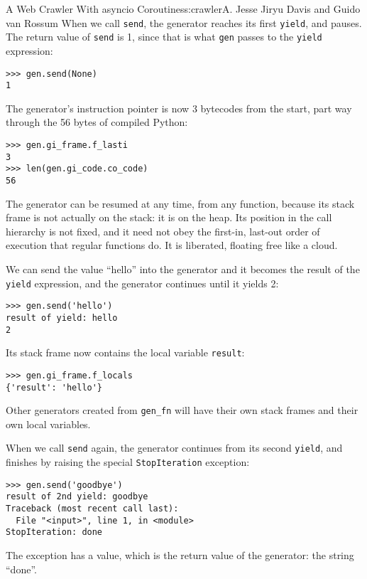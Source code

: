 \begin{aosachapter}{A Web Crawler With asyncio Coroutines}{s:crawler}{A. Jesse Jiryu Davis and Guido van Rossum}
When we call \texttt{send}, the generator reaches its first
\texttt{yield}, and pauses. The return value of \texttt{send} is 1,
since that is what \texttt{gen} passes to the \texttt{yield} expression:

\begin{verbatim}
>>> gen.send(None)
1
\end{verbatim}

The generator's instruction pointer is now 3 bytecodes from the start,
part way through the 56 bytes of compiled Python:

\begin{verbatim}
>>> gen.gi_frame.f_lasti
3
>>> len(gen.gi_code.co_code)
56
\end{verbatim}

The generator can be resumed at any time, from any function, because its
stack frame is not actually on the stack: it is on the heap. Its
position in the call hierarchy is not fixed, and it need not obey the
first-in, last-out order of execution that regular functions do. It is
liberated, floating free like a cloud.

We can send the value ``hello'' into the generator and it becomes the
result of the \texttt{yield} expression, and the generator continues
until it yields 2:

\begin{verbatim}
>>> gen.send('hello')
result of yield: hello
2
\end{verbatim}

Its stack frame now contains the local variable \texttt{result}:

\begin{verbatim}
>>> gen.gi_frame.f_locals
{'result': 'hello'}
\end{verbatim}

Other generators created from \texttt{gen\_fn} will have their own stack
frames and their own local variables.

When we call \texttt{send} again, the generator continues from its
second \texttt{yield}, and finishes by raising the special
\texttt{StopIteration} exception:

\begin{verbatim}
>>> gen.send('goodbye')
result of 2nd yield: goodbye
Traceback (most recent call last):
  File "<input>", line 1, in <module>
StopIteration: done
\end{verbatim}

The exception has a value, which is the return value of the generator:
the string ``done''.


\end{aosachapter}
